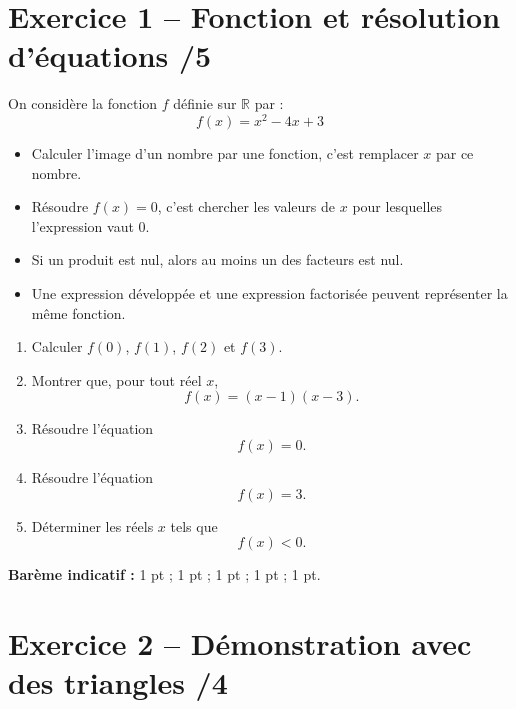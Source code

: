 \documentclass[11pt,a4paper]{article}
\begin{document}
\vspace{1.2em}

\section*{Exercice 1 -- Fonction et résolution d'équations \hfill /5}

On considère la fonction \(f\) définie sur \(\mathbb{R}\) par :
\[
f(x)=x^2-4x+3
\]

\begin{tcolorbox}[title=Rappels utiles]
\begin{itemize}[leftmargin=1.2cm]
    \item Calculer l'image d'un nombre par une fonction, c'est remplacer \(x\) par ce nombre.
    \item Résoudre \(f(x)=0\), c'est chercher les valeurs de \(x\) pour lesquelles l'expression vaut \(0\).
    \item Si un produit est nul, alors au moins un des facteurs est nul.
    \item Une expression développée et une expression factorisée peuvent représenter la même fonction.
\end{itemize}
\end{tcolorbox}

\begin{enumerate}[label=\textbf{\arabic*.}, leftmargin=1.2cm]
    \item Calculer \(f(0)\), \(f(1)\), \(f(2)\) et \(f(3)\).
    \item Montrer que, pour tout réel \(x\),
    \[
    f(x)=(x-1)(x-3).
    \]
    \item Résoudre l'équation
    \[
    f(x)=0.
    \]
    \item Résoudre l'équation
    \[
    f(x)=3.
    \]
    \item Déterminer les réels \(x\) tels que
    \[
    f(x)<0.
    \]
\end{enumerate}

\vspace{0.6em}
\textbf{Barème indicatif :} 1 pt ; 1 pt ; 1 pt ; 1 pt ; 1 pt.

\section*{Exercice 2 -- Démonstration avec des triangles \hfill /4}
\end{document}
